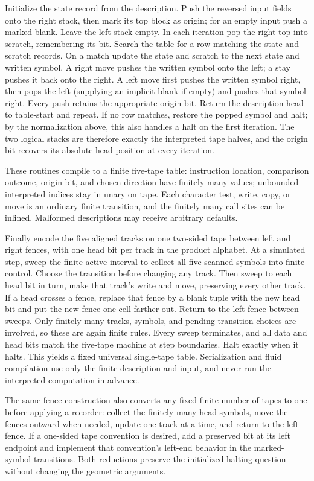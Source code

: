 Initialize the state record from the description.  Push the reversed
input fields onto the right stack, then mark its top block as origin;
for an empty input push a marked blank.  Leave the left stack empty.
In each iteration pop the right top into scratch, remembering its bit.
Search the table for a row matching the state and scratch records.
On a match update the state and scratch to the next state and written
symbol.  A right move pushes the written symbol onto the left; a stay
pushes it back onto the right.  A left move first pushes the written
symbol right, then pops the left (supplying an implicit blank if empty)
and pushes that symbol right.  Every push retains the appropriate
origin bit.  Return the description head to table-start and repeat.
If no row matches, restore the popped symbol and halt; by the normalization
above, this also handles a halt on the first iteration.  The two logical
stacks are therefore exactly the interpreted tape halves, and the
origin bit recovers its absolute head position at every iteration.

These routines compile to a finite five-tape table: instruction location,
comparison outcome, origin bit, and chosen direction have finitely many
values; unbounded interpreted indices stay in unary on tape.  Each
character test, write, copy, or move is an ordinary finite transition,
and the finitely many call sites can be inlined.  Malformed descriptions
may receive arbitrary defaults.

Finally encode the five aligned tracks on one two-sided tape between
left and right fences, with one head bit per track in the product
alphabet.  At a simulated step, sweep the finite active interval to
collect all five scanned symbols into finite control.  Choose the
transition before changing any track.  Then sweep to each head bit in
turn, make that track's write and move, preserving every other track.
If a head crosses a fence, replace that fence by a blank tuple with the
new head bit and put the new fence one cell farther out.  Return to the
left fence between sweeps.  Only finitely many tracks, symbols, and
pending transition choices are involved, so these are again finite
rules.  Every sweep terminates, and all data and head bits match the
five-tape machine at step boundaries.  Halt exactly when it halts.
This yields a fixed universal single-tape table.  Serialization and
fluid compilation use only the finite description and input, and never
run the interpreted computation in advance.

The same fence construction also converts any fixed finite number of
tapes to one before applying a recorder: collect the finitely many head
symbols, move the fences outward when needed, update one track at a time,
and return to the left fence.  If a one-sided tape convention is desired,
add a preserved bit at its left endpoint and implement that convention's
left-end behavior in the marked-symbol transitions.  Both reductions
preserve the initialized halting question without changing the geometric
arguments.
